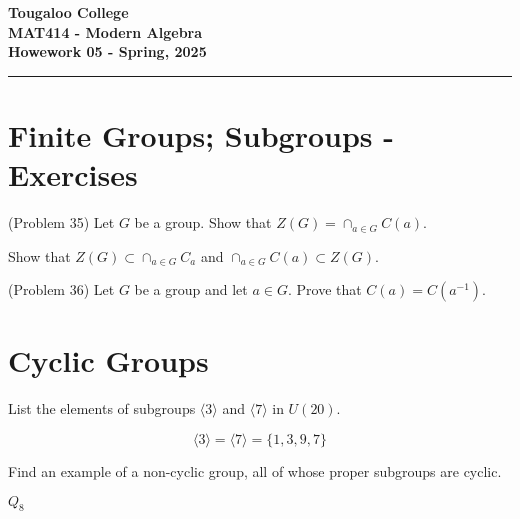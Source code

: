 \documentclass[12pt]{exam}
\newcommand{\paper}[5]{
    \setcounter{page}{1}
    
    \begin{minipage}{\textwidth}
    \Large{\textbf{Tougaloo College}}\\
    \textbf{#2}\\
    \textbf{#5 - #3}\\
    \end{minipage}
    \hfill
    
    \vspace{0.1in}
    \rule[1ex]{\textwidth}{2pt}
    }
\begin{document}
\paper{03//2025}{MAT414 - Modern Algebra}{Spring, 2025}{}{Howework 05}

\section*{Finite Groups; Subgroups - Exercises}
\begin{questions}



\question[20] (Problem 35) Let \(G\) be a group. Show that \(Z(G)=\cap_{a \in G} C(a)\).

\begin{solution}
    Show that \(Z(G) \subset \cap_{a\in G}C_a\) and \(\cap_{a\in G} C(a) \subset Z(G)\).
\end{solution}
\droptotalpoints

\question[20] (Problem 36) Let \(G\) be a group and let \(a \in G\). Prove that \(C(a) = C(a^{-1}).\)

\section*{Cyclic Groups}

\question[] List the elements of subgroups \(\langle 3 \rangle\) and \(\langle  7 \rangle\) in \(U(20)\).

\begin{solution}
    \[ \langle 3 \rangle = \langle 7 \rangle= \{1,3,9,7\}\]
\end{solution}

\question[] Find an example of a non-cyclic group, all of  whose proper subgroups are cyclic. 

\begin{solution}
    \(Q_8\)
\end{solution}






\end{questions}
\end{document}
